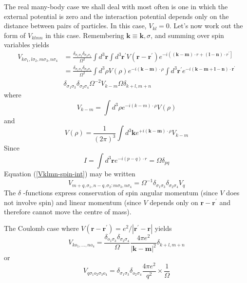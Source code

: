The real many-body case we shall deal with most often is one in which the external potential is zero and the interaction potential depends only on the distance between pairs of particles. In this case, $V_{kl}=0$. Let's now work out the form of $V_{klmn}$ in this case. Remembering $\mathbf{k}\equiv\mathbf{k},\sigma$, and summing over spin variables yields
\begin{equation}\begin{aligned}
V_{k \sigma_{1}, l \sigma_{2}, m \sigma_{3}, n \sigma_{4}} &=\frac{\delta_{\sigma_{1}\sigma_3}  \delta_{\sigma_{2} \sigma_{4}}}{\Omega^{2}} \int d^{3} \mathbf{r} \int d^{3} \mathbf{r}^{\prime} V\left(\mathbf{r}-\mathbf{r}^{\prime}\right) e^{-i\left((\mathbf{k}-\mathbf{m}) \cdot r+(\mathbf{l}-\mathbf{n}) \cdot r^{\prime}\right]} \\
&=\frac{\delta_{\sigma_{1} \sigma_{3}} \delta_{\sigma_{2} \sigma_{4}}}{\Omega^{2}} \int d^{3} \rho V(\rho) e^{-i(\mathbf{k}-\mathbf{m}) \cdot \rho} \int d^{3} \mathbf{r}^{\prime} e^{-i(\mathbf{k}-\mathbf{m}+\mathbf{l}-\mathbf{n}) \cdot \mathbf{r}^{\prime}}\\
&\delta_{\sigma_{1} \sigma_{3}} \delta_{\sigma_{2} \sigma_{4}} \Omega^{-2} V_{k-m} \Omega \delta_{k+l, m+n}
\end{aligned}
\label{Vklmn-spin-int}
\end{equation}
where
\begin{equation}V_{k-m}=\int d^{3} \rho e^{-i(k-m) \cdot \rho} V(\rho)\end{equation}
and
\begin{equation}V(\rho)=\frac{1}{(2 \pi)^{3}} \int d^{3} \mathbf{k} e^{+i(\mathbf{k}-\mathbf{m}) \cdot \rho} V_{k-m}\end{equation}
Since
$$I=\int d^{3} \mathbf{r} e^{-i(p-q) \cdot r}=\Omega \delta_{p q}$$
Equation (\ref{Vklmn-spin-int}) may be written
$$V_{m+q, \sigma_{1}, n-q, \sigma_{2}: m \sigma_{3}, n \sigma_{4}}=\Omega^{-1} \delta_{\sigma_{1} \sigma_{3}} \delta_{\sigma_{2} \sigma_{4}} V_{q}$$
The $\delta$ -functions express conservation of spin angular momentum (since $V$ does not involve spin) and linear momentum (since $V$ depends only on $\mathbf{r}-\mathbf{r}^{\prime}$ and therefore cannot move the centre of mass). 
\begin{mybox}
The Coulomb case where $V\left(\mathbf{r}-\mathbf{r}^{\prime}\right)=e^{2} /\left|\mathbf{r}^{\prime}-\mathbf{r}\right|$ yields
$$V_{k o_{1}, \ldots, n o_{4}}=\frac{\delta_{o_{1} \sigma_{3}} \delta_{\sigma_{2} \sigma_{4}}}{\Omega} \frac{4 \pi e^{2}}{|\mathbf{k}-\mathbf{m}|^{2}} \delta_{k+l, m+n}$$
or
\begin{equation}
    V_{q \sigma_{1} o_{2} \sigma_{3} o_{4}}=\delta_{\sigma_{1} \sigma_{3}} \delta_{o_{2} \sigma_{4}} \frac{4 \pi e^{2}}{q^{2}} \times \frac{1}{\Omega}
    \label{V-klmn-with-spin}
\end{equation}
\end{mybox}

